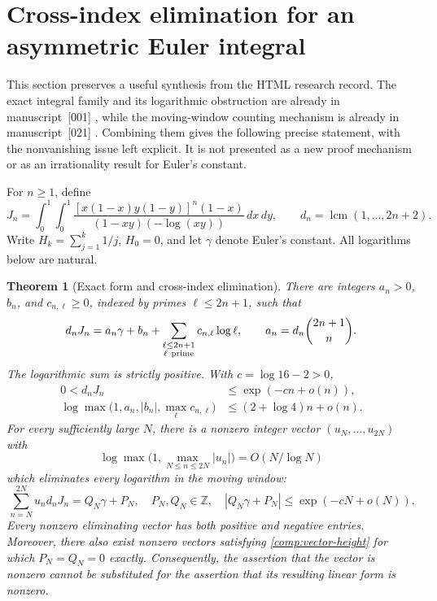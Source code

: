 \documentclass[11pt,a4paper]{article}
\newtheorem{theorem}{Theorem}[section]
\theoremstyle{definition}\newtheorem{definition}[theorem]{Definition}
\theoremstyle{remark}\newtheorem{remark}[theorem]{Remark}
\begin{document}
\section{Cross-index elimination for an asymmetric Euler integral}
\label{comp:section}

This section preserves a useful synthesis from the HTML research record.
The exact integral family and its logarithmic obstruction are already in
manuscript~[001] \cite{Corpus001}, while the moving-window counting mechanism is already in manuscript~[021] \cite{Corpus021}.  Combining them gives the
following precise statement, with the nonvanishing issue left explicit.
It is not presented as a new proof mechanism or as an irrationality
result for Euler's constant.

For $n\geq1$, define
\begin{equation}\label{comp:integral}
 J_n=\int_0^1\!\int_0^1
 \frac{[x(1-x)y(1-y)]^n(1-x)}
 {(1-xy)(-\log(xy))}\,dx\,dy,
 \qquad d_n=\operatorname{lcm}(1,\ldots,2n+2).
\end{equation}
Write $H_k=\sum_{j=1}^k1/j$, $H_0=0$, and let $\gamma$ denote
Euler's constant.  All logarithms below are natural.

\begin{theorem}[Exact form and cross-index elimination]
\label{comp:main}
There are integers $a_n>0$, $b_n$, and $c_{n,\ell}\geq0$, indexed by
primes $\ell\leq2n+1$, such that
\begin{equation}\label{comp:integer-form}
 d_nJ_n=a_n\gamma+b_n+
 \sum_{\substack{\ell\leq2n+1\\\ell\ {\rm prime}}}
 c_{n,\ell}\log\ell,
 \qquad a_n=d_n\binom{2n+1}{n}.
\end{equation}
The logarithmic sum is strictly positive.  With $c=\log16-2>0$,
\begin{align}
 0<d_nJ_n&\leq\exp(-cn+o(n)),\label{comp:smallness}\\
 \log\max\bigl(1,a_n,|b_n|,\max_\ell c_{n,\ell}\bigr)
 &\leq(2+\log4)n+o(n).\label{comp:height}
\end{align}
For every sufficiently large $N$, there is a nonzero integer vector
$(u_N,\ldots,u_{2N})$ with
\begin{equation}\label{comp:vector-height}
 \log\max\bigl(1,\max_{N\leq n\leq2N}|u_n|\bigr)
 =O(N/\log N)
\end{equation}
which eliminates every logarithm in the moving window:
\begin{equation}\label{comp:compressed}
 \sum_{n=N}^{2N}u_nd_nJ_n=Q_N\gamma+P_N,
 \quad P_N,Q_N\in\mathbb Z,
 \quad |Q_N\gamma+P_N|\leq\exp(-cN+o(N)).
\end{equation}
Every nonzero eliminating vector has both positive and negative entries.
Moreover, there also exist nonzero vectors satisfying
\eqref{comp:vector-height} for which $P_N=Q_N=0$ exactly.
Consequently, the assertion that the vector is nonzero cannot be
substituted for the assertion that its resulting linear form is nonzero.
\end{theorem}
\end{document}
